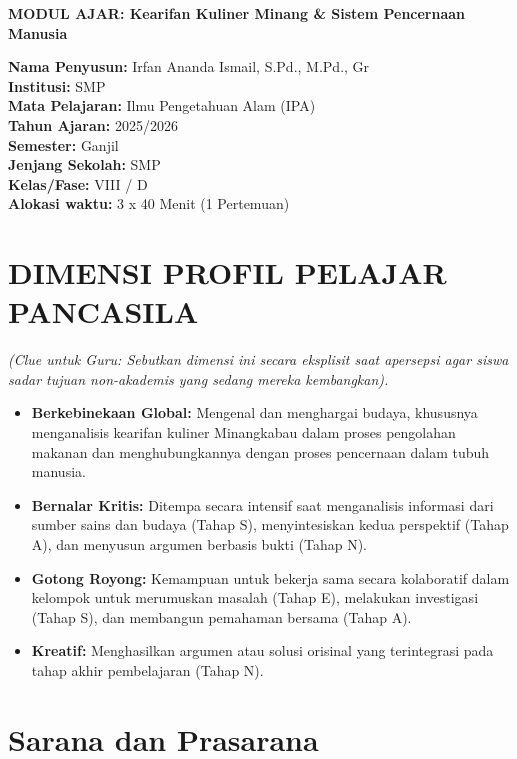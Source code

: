 \documentclass[a4paper,12pt]{article}
\begin{document}
\begin{center}
{\Large\textbf{MODUL AJAR: Kearifan Kuliner Minang \& Sistem Pencernaan Manusia}}
\end{center}

\vspace{0.5cm}

\begin{tcolorbox}[mainbox]
\textbf{Nama Penyusun:} Irfan Ananda Ismail, S.Pd., M.Pd., Gr \\
\textbf{Institusi:} SMP \\
\textbf{Mata Pelajaran:} Ilmu Pengetahuan Alam (IPA) \\
\textbf{Tahun Ajaran:} 2025/2026 \\
\textbf{Semester:} Ganjil \\
\textbf{Jenjang Sekolah:} SMP \\
\textbf{Kelas/Fase:} VIII / D \\
\textbf{Alokasi waktu:} 3 x 40 Menit (1 Pertemuan)
\end{tcolorbox}

\section{DIMENSI PROFIL PELAJAR PANCASILA}
\textit{(Clue untuk Guru: Sebutkan dimensi ini secara eksplisit saat apersepsi agar siswa sadar tujuan non-akademis yang sedang mereka kembangkan).}

\begin{itemize}
\item \textbf{Berkebinekaan Global:} Mengenal dan menghargai budaya, khususnya menganalisis kearifan kuliner Minangkabau dalam proses pengolahan makanan dan menghubungkannya dengan proses pencernaan dalam tubuh manusia.
\item \textbf{Bernalar Kritis:} Ditempa secara intensif saat menganalisis informasi dari sumber sains dan budaya (Tahap S), menyintesiskan kedua perspektif (Tahap A), dan menyusun argumen berbasis bukti (Tahap N).
\item \textbf{Gotong Royong:} Kemampuan untuk bekerja sama secara kolaboratif dalam kelompok untuk merumuskan masalah (Tahap E), melakukan investigasi (Tahap S), dan membangun pemahaman bersama (Tahap A).
\item \textbf{Kreatif:} Menghasilkan argumen atau solusi orisinal yang terintegrasi pada tahap akhir pembelajaran (Tahap N).
\end{itemize}

\section{Sarana dan Prasarana}
\end{document}
